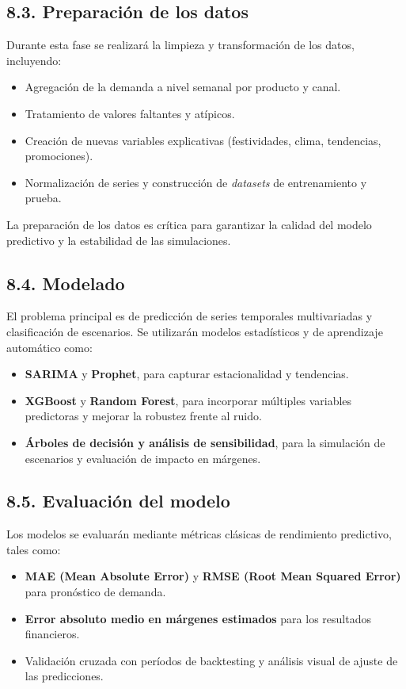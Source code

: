 \documentclass[
11pt, %
]{charter}
\begin{document}
\subsection*{8.3. Preparación de los datos}
Durante esta fase se realizará la limpieza y transformación de los datos, incluyendo:
\begin{itemize}
  \item Agregación de la demanda a nivel semanal por producto y canal.
  \item Tratamiento de valores faltantes y atípicos.
  \item Creación de nuevas variables explicativas (festividades, clima, tendencias, promociones).
  \item Normalización de series y construcción de \textit{datasets} de entrenamiento y prueba.
\end{itemize}
La preparación de los datos es crítica para garantizar la calidad del modelo predictivo y la estabilidad de las simulaciones.

\subsection*{8.4. Modelado}
El problema principal es de predicción de series temporales multivariadas y clasificación de escenarios. Se utilizarán modelos estadísticos y de aprendizaje automático como:
\begin{itemize}
  \item \textbf{SARIMA} y \textbf{Prophet}, para capturar estacionalidad y tendencias.
  \item \textbf{XGBoost} y \textbf{Random Forest}, para incorporar múltiples variables predictoras y mejorar la robustez frente al ruido.
  \item \textbf{Árboles de decisión y análisis de sensibilidad}, para la simulación de escenarios y evaluación de impacto en márgenes.
\end{itemize}

\subsection*{8.5. Evaluación del modelo}
Los modelos se evaluarán mediante métricas clásicas de rendimiento predictivo, tales como:
\begin{itemize}
  \item \textbf{MAE (Mean Absolute Error)} y \textbf{RMSE (Root Mean Squared Error)} para pronóstico de demanda.
  \item \textbf{Error absoluto medio en márgenes estimados} para los resultados financieros.
  \item Validación cruzada con períodos de backtesting y análisis visual de ajuste de las predicciones.
\end{itemize}
\end{document}
